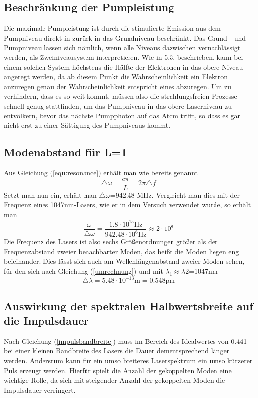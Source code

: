 \subsection{Beschränkung der Pumpleistung}
Die maximale Pumpleistung ist durch die stimulierte Emission aus dem Pumpniveau direkt in zurück in das Grundniveau beschränkt. Das Grund - und Pumpniveau lassen sich nämlich, wenn alle Niveaus dazwischen vernachlässigt werden, als Zweiniveausystem interpretieren. Wie in 5.3. beschrieben, kann bei einem solchen System höchstens die Hälfte der Elektronen in das obere Niveau angeregt werden, da ab diesem Punkt die Wahrscheinlichkeit ein Elektron anzuregen genau der Wahrscheinlichkeit entspricht eines abzuregen. \newline
Um zu verhindern, dass es so weit kommt, müssen also die strahlungsfreien Prozesse schnell genug stattfinden, um das Pumpniveau in das obere Laserniveau zu entvölkern, bevor das nächste Pumpphoton auf das Atom trifft, so dass es gar nicht erst zu einer Sättigung des Pumpniveaus kommt. 
\subsection{Modenabstand für L=1}
Aus Gleichung (\ref{equ:resonance}) erhält man wie bereits genannt
\begin{equation*}
	\triangle\omega=\frac{c\pi}{L}=2\pi\triangle f
\end{equation*}
Setzt man nun ein, erhält man $\triangle\omega$=942.48 MHz. Vergleicht man dies mit der Frequenz eines 1047nm-Lasers, wie er in dem Versuch verwendet wurde, so erhält man
\begin{equation*}
\frac{\omega}{\triangle\omega}=\frac{1.8\cdot10^{15}\text{Hz}}{942.48\cdot10^6 \text{Hz}}\approx2\cdot10^6
\end{equation*}
Die Frequenz des Lasers ist also sechs Größenordnungen größer als der Frequenzabstand zweier benachbarter Moden, das heißt die Moden liegen eng beieinander. Dies lässt sich auch am Wellenlängenabstand zweier Moden sehen, für den sich nach Gleichung (\ref{umrechnung}) und mit $\lambda_1\approx\lambda2$=1047nm
\begin{equation*}
\triangle\lambda=5.48\cdot10^{-13}\text{m}=0.548 \text{pm}
\end{equation*}
\subsection{Auswirkung der spektralen Halbwertsbreite auf die Impulsdauer}
Nach Gleichung (\ref{impulsbandbreite}) muss im Bereich des Idealwertes von 0.441 bei einer kleinen Bandbreite des Lasers die Dauer dementsprechend länger werden. Andersrum kann für ein umso breiteres Laserspektrum ein umso kürzerer Puls erzeugt werden. Hierfür spielt die Anzahl der gekoppelten Moden eine wichtige Rolle, da sich mit steigender Anzahl der gekoppelten Moden die Impulsdauer verringert.
